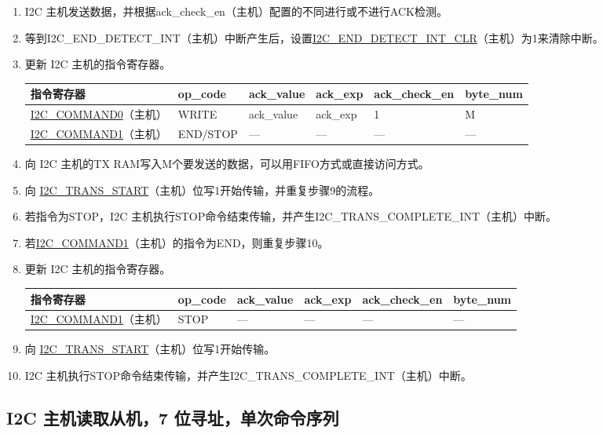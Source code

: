\documentclass[main\_\_CN.tex]{subfiles}
\begin{document}
\begin{enumerate}
\item I2C 主机发送数据，并根据ack\_check\_en（主机）配置的不同进行或不进行ACK检测。

\item 等到I2C\_END\_DETECT\_INT（主机）中断产生后，设置\hyperref[fielddesc:I2CENDDETECTINTCLR]{I2C\_END\_DETECT\_INT\_CLR}（主机）为1来清除中断。
\item 更新 I2C 主机的指令寄存器。
\begin{longtable}{ | p{4cm} | p{2cm} | p{2cm} | p{2cm} |p{2cm} | p{2cm} |}
\hline\rowcolor{lightgray}
指令寄存器& op\_code & ack\_value&ack\_exp&ack\_check\_en&byte\_num  \\ \hline
\hyperref[fielddesc:I2CCOMMAND0]{I2C\_COMMAND0}（主机）& WRITE& ack\_value&ack\_exp&1&M  \\ \hline
\hyperref[fielddesc:I2CCOMMAND1]{I2C\_COMMAND1}（主机）& END/STOP& ---&---&---&---  \\ \hline
\end{longtable} 
\item 向 I2C 主机的TX RAM写入M个要发送的数据，可以用FIFO方式或直接访问方式。
\item 向 \hyperref[fielddesc:I2CTRANSSTART]{I2C\_TRANS\_START}（主机）位写1开始传输，并重复步骤9的流程。
\item 若指令为STOP，I2C 主机执行STOP命令结束传输，并产生I2C\_TRANS\_COMPLETE\_INT（主机）中断。
\item 若\hyperref[fielddesc:I2CCOMMAND1]{I2C\_COMMAND1}（主机）的指令为END，则重复步骤10。
\item 更新 I2C 主机的指令寄存器。
\begin{longtable}{ | p{4cm} | p{2cm} | p{2cm} | p{2cm} |p{2cm} | p{2cm} |}
\hline\rowcolor{lightgray}
指令寄存器& op\_code & ack\_value&ack\_exp&ack\_check\_en&byte\_num  \\ \hline
\hyperref[fielddesc:I2CCOMMAND1]{I2C\_COMMAND1}（主机）& STOP& ---&---&---&---  \\ \hline
\end{longtable} 
\item 向 \hyperref[fielddesc:I2CTRANSSTART]{I2C\_TRANS\_START}（主机）位写1开始传输。
\item I2C 主机执行STOP命令结束传输，并产生I2C\_TRANS\_COMPLETE\_INT（主机）中断。

\end{enumerate}



\subsection{I2C 主机读取从机，7 位寻址，单次命令序列}
\end{document}

